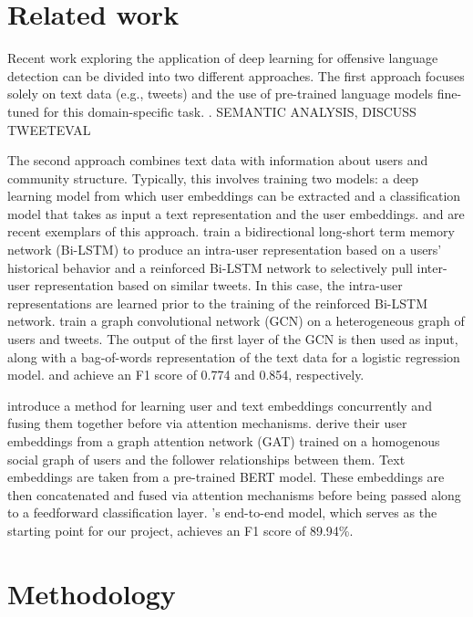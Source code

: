 \documentclass[letterpaper]{article} %
\begin{document}
\section{Related work}

Recent work exploring the application of deep learning for offensive language detection can be divided into two different approaches. The first approach focuses solely on text data (e.g., tweets) and the use of pre-trained language models fine-tuned for this domain-specific task. \citet{liu2019-nuli}. SEMANTIC ANALYSIS, DISCUSS TWEETEVAL

The second approach combines text data with information about users and community structure. Typically, this involves training two models: a deep learning model from which user embeddings can be extracted and a classification model that takes as input a text representation and the user embeddings. \citet{qian-etal-2018-leveraging} and \citet{Mishra2019} are recent exemplars of this approach. \citet{qian-etal-2018-leveraging} train a bidirectional long-short term memory network (Bi-LSTM) to produce an intra-user representation based on a users' historical behavior and a reinforced Bi-LSTM network to selectively pull inter-user representation based on similar tweets. In this case, the intra-user representations are learned prior to the training of the reinforced Bi-LSTM network. \citet{Mishra2019} train a graph convolutional network (GCN) on a heterogeneous graph of users and tweets. The output of the first layer of the GCN is then used as input, along with a bag-of-words representation of the text data for a logistic regression model. \citet{qian-etal-2018-leveraging} and \citet{Mishra2019} achieve an F1 score of 0.774 and 0.854, respectively.

\citet{Miao2022} introduce a method for learning user and text embeddings concurrently and fusing them together before via attention mechanisms. \citet{Miao2022} derive their user embeddings from a graph attention network (GAT) trained on a homogenous social graph of users and the follower relationships between them. Text embeddings are taken from a pre-trained BERT model. These embeddings are then concatenated and fused via attention mechanisms before being passed along to a feedforward classification layer. \citet{Miao2022}'s end-to-end model, which serves as the starting point for our project, achieves an F1 score of 89.94\%.


\section{Methodology}
\end{document}
